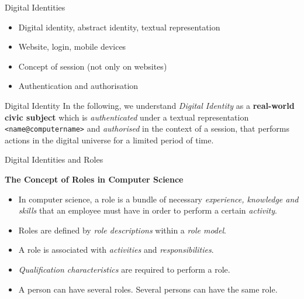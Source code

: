 \documentclass{beamer}
\newcommand{\ueberschrift}[1]{\begin{center}\bf #1\end{center}}
\begin{document}
\begin{frame}{Digital Identities}
\begin{itemize}
\item Digital identity, abstract identity, textual representation
\item Website, login, mobile devices
\item Concept of session (not only on websites)
\item Authentication and authorisation
\end{itemize}
\begin{block}{Digital Identity}
  In the following, we understand \emph{Digital Identity} as a
  \textbf{real-world civic subject} which is \emph{authenticated} under a
  textual representation \texttt{<name@computername>} and \emph{authorised} in
  the context of a session, that performs actions in the digital universe for
  a limited period of time.
\end{block}
\end{frame}
\begin{frame}{Digital Identities and Roles}
  \ueberschrift{The Concept of Roles in Computer Science}
  
\begin{itemize}
\item In computer science, a role is a bundle of necessary \emph{experience,
  knowledge and skills} that an employee must have in order to perform a
  certain \emph{activity}.
\item Roles are defined by \emph{role descriptions} within a \emph{role
  model}.
\item A role is associated with \emph{activities} and \emph{responsibilities}.
\item \emph{Qualification characteristics} are required to perform a role.
\item A person can have several roles. Several persons can have the same role.
\end{itemize}
\end{frame}
\end{document}

